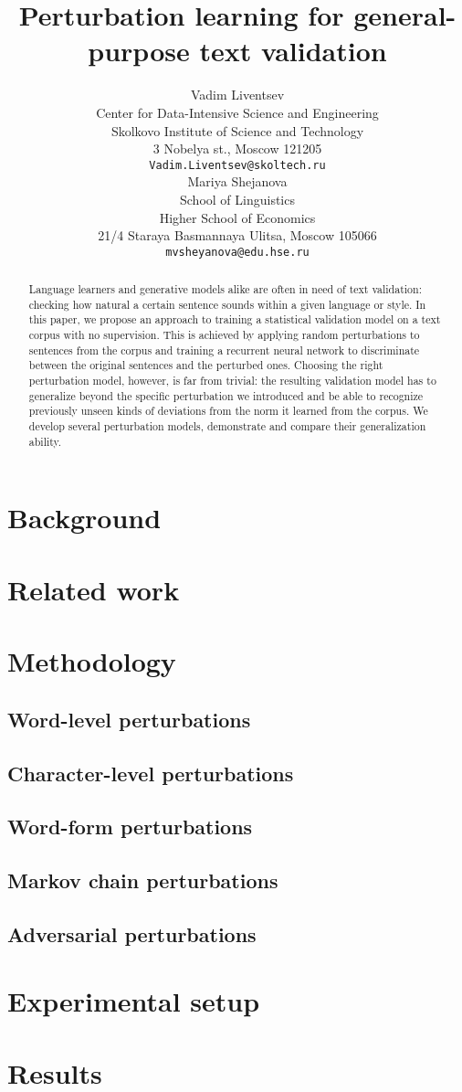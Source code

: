 \documentclass[11pt,a4paper]{article}
\title{Perturbation learning for general-purpose text validation}
\author{Vadim Liventsev \\
  Center for Data-Intensive Science and Engineering \\
  Skolkovo Institute of Science and Technology\\
  3 Nobelya st., Moscow 121205 \\
  {\tt Vadim.Liventsev@skoltech.ru} \\\And
  Mariya Shejanova \\
  School of Linguistics \\
  Higher School of Economics \\
  21/4 Staraya Basmannaya Ulitsa, Moscow 105066 \\
  {\tt mvsheyanova@edu.hse.ru} \\}
\date{}
\begin{document}
\maketitle
\begin{abstract}
  Language learners and generative models alike are often in need of text validation: checking how natural a certain sentence sounds within a given language or style.
  In this paper, we propose an approach to training a statistical validation model on a text corpus with no supervision.
  This is achieved by applying random perturbations to sentences from the corpus and training a recurrent neural network to discriminate between the original sentences and the perturbed ones.
  Choosing the right perturbation model, however, is far from trivial: the resulting validation model has to generalize beyond the specific perturbation we introduced and be able to recognize previously unseen kinds of deviations from the norm it learned from the corpus.
  We develop several perturbation models, demonstrate and compare their generalization ability.
\end{abstract}

\section{Background}
\label{sec:background}

\section{Related work}
\label{sec:related-work}

\section{Methodology}
\label{sec:methodology}

\subsection{Word-level perturbations}

\subsection{Character-level perturbations}

\subsection{Word-form perturbations}

\subsection{Markov chain perturbations}

\subsection{Adversarial perturbations}

\section{Experimental setup}
\label{sec:setup}

\section{Results}
\label{sec:results}
\end{document}

